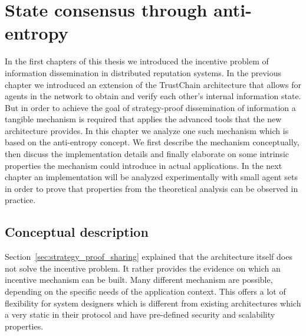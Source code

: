\chapter{State consensus through anti-entropy}
\label{chap:mechanism}

In the first chapters of this thesis we introduced the incentive problem of information dissemination 
in distributed reputation systems. In the previous chapter we introduced an extension of the TrustChain
architecture that allows for agents in the network to obtain and verify each other's internal 
information state. But in order to achieve the goal of strategy-proof dissemination of information
a tangible mechanism is required that applies the advanced tools that the new architecture provides.
In this chapter we analyze one such mechanism which is based on the anti-entropy concept. We first
describe the mechanism conceptually, then discuss the implementation details and finally elaborate
on some intrinsic properties the mechanism could introduce in actual applications. In the next
chapter an implementation will be analyzed experimentally with small agent sets in order to prove
that properties from the theoretical analysis can be observed in practice.

\section{Conceptual description}



Section~\ref{sec:strategy_proof_sharing} explained that the architecture itself does not solve the 
incentive problem. It rather provides the evidence on which an incentive mechanism can be built. 
Many different mechanism are possible, depending on the specific needs of the application context. 
This offers a lot of flexibility for system designers which is different from existing architectures
which a very static in their protocol and have pre-defined security and scalability properties.

